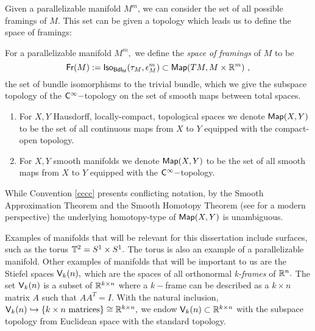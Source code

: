 Given a parallelizable manifold $M^{m}$, we can consider the set of all possible framings of $M.$ This set can be given a topology which leads us to define the space of framings:
\begin{definition} \label{spaceoframes}
For a parallelizable manifold $M^{m},$ we define the \textit{space of framings} of $M$ to be
\[
{\sf Fr}(M) := {\sf Iso_{Bdl_{M}}}(\tau_{M}, \epsilon^{m}_{M}) \subset {\sf Map}(TM, M \times \mathbb R^{m}) ~,
\]
the set of bundle isomorphisms to the trivial bundle, which we give the subspace topology of the ${\sf C}^{\infty}-$topology on the set of smooth maps between total spaces.
\end{definition}


\begin{convention} \label{cccc}
\begin{enumerate}
\item For $X, Y$ Hausdorff, locally-compact, topological spaces we denote ${\sf Map}(X, Y)$ to be the set of all continuous maps from $X$ to $Y$ equipped with the compact-open topology.
\item For $X, Y$ smooth manifolds we denote ${\sf Map}(X, Y)$ to be the set of all smooth maps from $X$ to $Y$ equipped with the ${\sf C}^{\infty}-$topology.
\end{enumerate}
\end{convention}
\begin{remark}
While Convention \ref{cccc} presents conflicting notation, by the Smooth Approximation Theorem and the Smooth Homotopy Theorem (see \cite{Woc} for a modern perspective) the underlying homotopy-type of ${\sf Map}(X, Y)$ is unambiguous. 
\end{remark}



Examples of manifolds that will be relevant for this dissertation include surfaces, such as the torus $\mathbb T^{2} = S^{1} \times S^{1}.$ The torus is also an example of a parallelizable manifold. Other examples of manifolds that will be important to us are the Stiefel spaces $\mathsf V_{k}(n),$ which are the spaces of all orthonormal \textit{k-frames} of $\mathbb R^{n}.$ The set $\mathsf V_{k}(n)$ is a subset of $\mathbb R^{k \times n}$ where a $k-$frame can be described as a $k \times n$ matrix $A$ such that $AA^{T} = I.$ With the natural inclusion, $\mathsf V_{k}(n) \hookrightarrow \{ k \times n \text{ matrices} \} \cong \mathbb R^{k \times n},$ we endow $\mathsf V_{k}(n) \subset \mathbb R^{k \times n}$ with the subspace topology from Euclidean space with the standard topology. 

